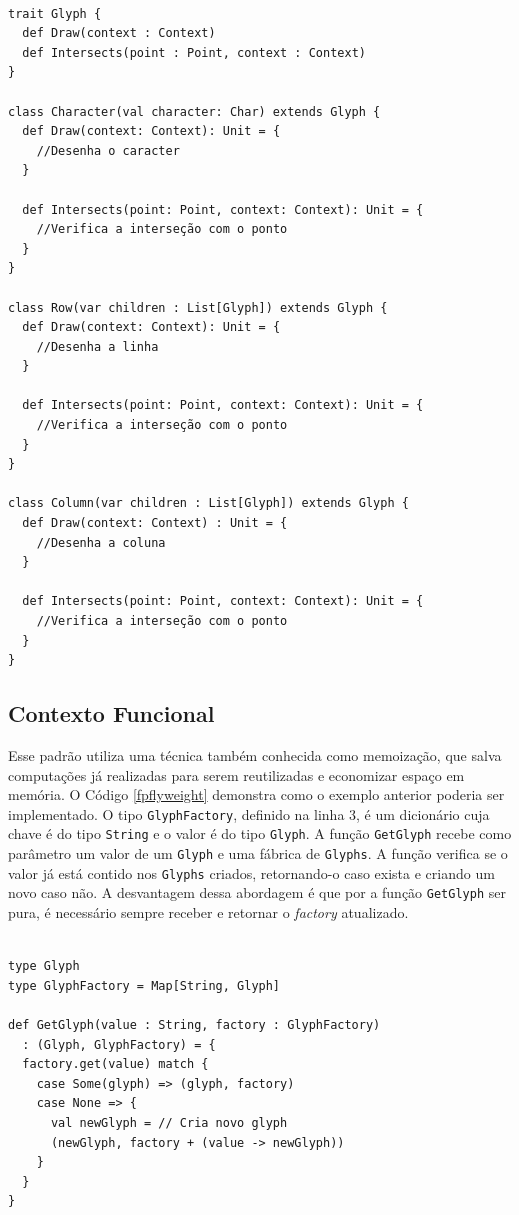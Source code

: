 \begin{lstlisting}[caption={\textit{Flyweight} Orientado a Objetos.},label=ooflyweight]

trait Glyph {
  def Draw(context : Context)
  def Intersects(point : Point, context : Context)
}

class Character(val character: Char) extends Glyph {
  def Draw(context: Context): Unit = {
    //Desenha o caracter
  }

  def Intersects(point: Point, context: Context): Unit = {
    //Verifica a interseção com o ponto
  }
}

class Row(var children : List[Glyph]) extends Glyph {
  def Draw(context: Context): Unit = {
    //Desenha a linha
  }

  def Intersects(point: Point, context: Context): Unit = {
    //Verifica a interseção com o ponto
  }
}

class Column(var children : List[Glyph]) extends Glyph {
  def Draw(context: Context) : Unit = {
    //Desenha a coluna
  }

  def Intersects(point: Point, context: Context): Unit = {
    //Verifica a interseção com o ponto
  }
}

\end{lstlisting}

\subsection*{Contexto Funcional}

Esse padrão utiliza uma técnica também conhecida 
como memoização, que salva computações já realizadas 
para serem reutilizadas e economizar espaço em 
memória\cite{scalafunctpatterns}. O Código \ref{fpflyweight} 
demonstra como o exemplo anterior poderia ser 
implementado. O tipo \texttt{GlyphFactory}, definido na 
linha 3, é um dicionário cuja chave é do tipo 
\texttt{String} e o valor é do tipo \texttt{Glyph}. A função 
\texttt{GetGlyph} recebe como parâmetro um valor de um 
\texttt{Glyph} e uma fábrica de \texttt{Glyphs}. A função verifica 
se o valor já está contido nos \texttt{Glyphs} criados, 
retornando-o caso exista e criando um novo 
caso não. A desvantagem dessa abordagem é que 
por a função \texttt{GetGlyph} ser pura, é necessário 
sempre receber e retornar o \textit{factory} 
atualizado.

\begin{lstlisting}[caption={\textit{Flyweight} Funcional.},label=fpflyweight]
    
type Glyph
type GlyphFactory = Map[String, Glyph]

def GetGlyph(value : String, factory : GlyphFactory)
  : (Glyph, GlyphFactory) = {
  factory.get(value) match {
    case Some(glyph) => (glyph, factory)
    case None => {
      val newGlyph = // Cria novo glyph 
      (newGlyph, factory + (value -> newGlyph))
    }
  }
}
    
\end{lstlisting}
